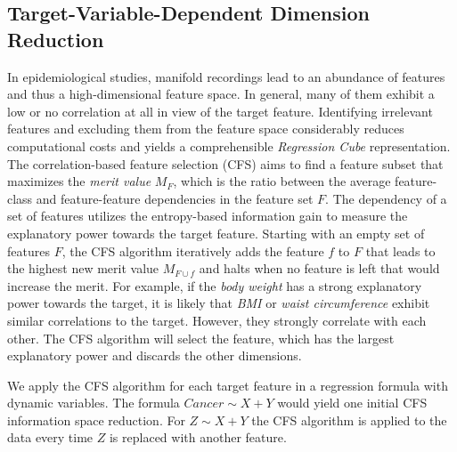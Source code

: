 \documentclass[journal]{style/vgtc} 			          %
\begin{document}
\subsection{Target-Variable-Dependent Dimension Reduction}
In epidemiological studies, manifold recordings lead to an abundance of features and thus a high-dimensional feature space.
In general, many of them exhibit a low or no correlation at all in view of the target feature.
Identifying irrelevant features and excluding them from the feature space considerably reduces computational costs and yields a comprehensible \emph{Regression Cube} representation.
The correlation-based feature selection (CFS) \cite{CFS} aims to find a feature subset that maximizes the \emph{merit value} $M_F$, which is the ratio between the average feature-class and feature-feature dependencies in the feature set $F$.
The dependency of a set of features utilizes the entropy-based information gain to measure the explanatory power towards the target feature.
Starting with an empty set of features $F$, the CFS algorithm iteratively adds the feature $f$ to $F$ that leads to the highest new merit value $M_{F\cup f}$ and halts when no feature is left that would increase the merit.
For example, if the \emph{body weight} has a strong explanatory power towards the target, it is likely that \emph{BMI} or \emph{waist circumference} exhibit similar correlations to the target.
However, they strongly correlate with each other.
The CFS algorithm will select the feature, which has the largest explanatory power and discards the other dimensions.

We apply the CFS algorithm for each target feature in a regression formula with dynamic variables.
The formula $Cancer \sim X + Y$ would yield one initial CFS information space reduction.
For $Z \sim X + Y$ the CFS algorithm is applied to the data every time $Z$ is replaced with another feature.
\end{document}

